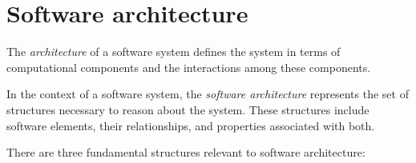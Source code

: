 \section{Software architecture}

\begin{definition}
    The \emph{architecture} of a software system defines the system in terms of computational components and the interactions among these components.

    In the context of a software system, the \emph{software architecture} represents the set of structures necessary to reason about the system. 
    These structures include software elements, their relationships, and properties associated with both.
\end{definition}
There are three fundamental structures relevant to software architecture:
